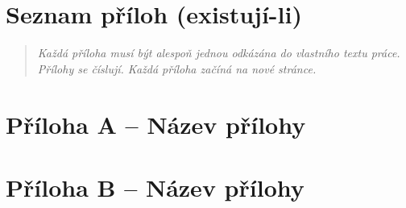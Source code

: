 \documentclass[
]{article}
\begin{document}
\newpage
\hypertarget{seznam-pux159uxedloh-existujuxed-li}{%
  \section{Seznam příloh
    (existují-li)}\label{seznam-pux159uxedloh-existujuxed-li}}

\begin{quote}
  \emph{Každá příloha musí být alespoň jednou odkázána do vlastního textu
    práce. Přílohy se číslují. Každá příloha začíná na nové stránce.}
\end{quote}

\newpage
\hypertarget{pux159uxedloha-a-nuxe1zev-pux159uxedlohy}{%
  \section{Příloha A -- Název
    přílohy}\label{pux159uxedloha-a-nuxe1zev-pux159uxedlohy}}

\newpage
\hypertarget{pux159uxedloha-b-nuxe1zev-pux159uxedlohy}{%
  \section{Příloha B -- Název
    přílohy}\label{pux159uxedloha-b-nuxe1zev-pux159uxedlohy}}
\end{document}

